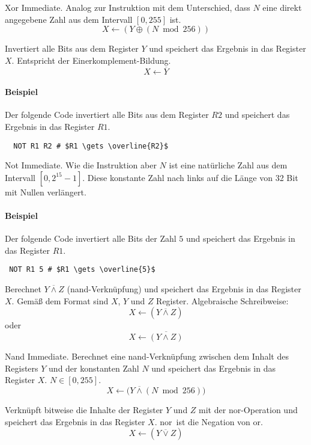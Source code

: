 \glqq Xor Immediate\grqq.
Analog zur Instruktion  mit dem Unterschied, dass $N$ eine direkt
angegebene Zahl aus dem Intervall $[0, 255]$ ist.
\[
    X \gets (Y \oplus (N \bmod 256))
\]


Invertiert alle Bits aus dem Register $Y$ und speichert das Ergebnis in das
Register $X$. Entspricht der Einerkomplement-Bildung.
\[
    X \gets \overline{Y}
\]

\paragraph{Beispiel} 
Der folgende Code invertiert alle Bits aus dem Register $R2$ und speichert das
Ergebnis in das Register $R1$.
\begin{lstlisting}
  NOT R1 R2 # $R1 \gets \overline{R2}$
\end{lstlisting}



\glqq Not Immediate\grqq.
Wie die Instruktion  aber $N$ ist eine natürliche Zahl aus dem
Intervall $[0, 2^{15}-1]$. Diese konstante Zahl nach links auf die Länge von 32
Bit mit Nullen verlängert.

\paragraph{Beispiel} 
Der folgende Code invertiert alle Bits der Zahl $5$ und speichert das Ergebnis
in das Register $R1$.
\begin{lstlisting}
 NOT R1 5 # $R1 \gets \overline{5}$
\end{lstlisting}


Berechnet $Y \overline{\land} Z$ (nand-Verknüpfung) und speichert das Ergebnis
in das Register $X$. Gemäß dem Format  sind $X$, $Y$ und $Z$
Register.
Algebraische Schreibweise:
\[
    X \gets (Y \overline{\land} Z)
\]
oder
\[
    X \gets \overline{ (Y \land Z) }
\]


\glqq Nand Immediate\grqq.
Berechnet eine nand-Verknüpfung zwischen dem Inhalt des Registers $Y$ und der
konstanten Zahl $N$ und speichert das Ergebnis in das Register $X$.
$N \in [0, 255]$.
\[
    X \gets \big(Y \overline{\land} (N \bmod 256) \big)
\]


Verknüpft bitweise die Inhalte der Register $Y$ und $Z$ mit der nor-Operation
und speichert das Ergebnis in das Register $X$.
\glqq nor\grqq\ ist die Negation von \glqq or\grqq.
\[
    X \gets (Y \overline{\lor} Z)
\]
